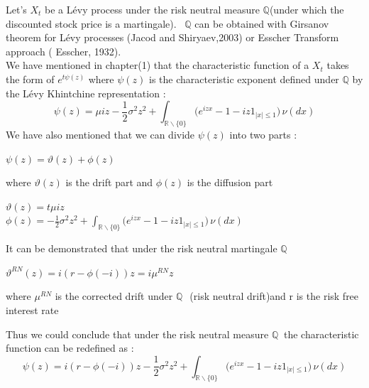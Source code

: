 \documentclass[12pt]{report}
\begin{document}
Let's $X_t$ be a Lévy process under the risk neutral measure $\mathbb{Q}$(under which the discounted stock price is a martingale).~ $\mathbb{Q}$ can be obtained with  Girsanov theorem for Lévy processes (Jacod and Shiryaev,2003) or Esscher Transform approach ( Esscher, 1932).\\ 
We have mentioned in chapter(1) that the characteristic function of a $X_t$ takes the form of $e^{t \psi(z)}$
where  $\psi(z)$ is the characteristic exponent defined under $\mathbb{Q}$ by the Lévy Khintchine representation : 
\begin{equation}
\psi (z)= \mu iz - \frac{1}{2}\sigma^2  z^2 + 
\int_{\mathbb{R}\backslash\{0\}} \big( e^{izx}-1 -iz 1_{|x| \leq  1  } \big)\,\nu(dx) 
\end{equation}
We have also mentioned that we can divide $\psi (z)$ into two parts :
\begin{center}
$\psi(z)= \vartheta(z)+\phi(z)$
\end{center}
where $ \vartheta(z)$ is the drift part and $\phi(z)$ is the diffusion part 
\begin{center}
$ \vartheta(z)=t \mu iz$\\
$ \phi(z)= - \frac{1}{2}\sigma^2  z^2 + 
\int_{\mathbb{R}\backslash\{0\}} \big( e^{izx}-1 -iz 1_{|x| \leq  1  } \big)\,\nu(dx)$
\end{center}
It can be demonstrated that under the risk neutral martingale $\mathbb{Q}$
\begin{center}
 $\vartheta^{RN}(z)=i(r-\phi(-i))z=i\mu^{RN} z$ 
\end{center}
where $\mu^{RN}$ is the corrected drift under $\mathbb{Q}~$~(risk neutral drift)and r is the risk free interest rate 

Thus we could conclude that under the risk neutral measure $\mathbb{Q}~$ the characteristic function can be redefined as :
\begin{equation}
\psi (z)= i(r-\phi(-i))z - \frac{1}{2}\sigma^2  z^2 + 
\int_{\mathbb{R}\backslash\{0\}} \big( e^{izx}-1 -iz 1_{|x| \leq  1  } \big)\,\nu(dx) 
\end{equation}
\end{document}
